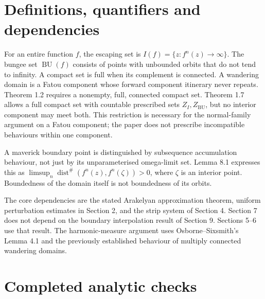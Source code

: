 \documentclass[10pt]{article}
\begin{document}
\section*{Definitions, quantifiers and dependencies}
For an entire function \(f\), the escaping set is \(I(f)=\{z:f^n(z)\to\infty\}\). The bungee set \(\operatorname{BU}(f)\) consists of points with unbounded orbits that do not tend to infinity. A compact set is full when its complement is connected. A wandering domain is a Fatou component whose forward component itinerary never repeats. Theorem 1.2 requires a nonempty, full, connected compact set. Theorem 1.7 allows a full compact set with countable prescribed sets \(Z_I,Z_{\operatorname{BU}}\), but no interior component may meet both. This restriction is necessary for the normal-family argument on a Fatou component; the paper does not prescribe incompatible behaviours within one component.\par
A maverick boundary point is distinguished by subsequence accumulation behaviour, not just by its unparameterised omega-limit set. Lemma 8.1 expresses this as \(\limsup_n\operatorname{dist}^\#(f^n(z),f^n(\zeta))>0\), where \(\zeta\) is an interior point. Boundedness of the domain itself is not boundedness of its orbits.\par
The core dependencies are the stated Arakelyan approximation theorem, uniform perturbation estimates in Section 2, and the strip system of Section 4. Section 7 does not depend on the boundary interpolation result of Section 9. Sections 5–6 use that result. The harmonic-measure argument uses Osborne–Sixsmith’s Lemma 4.1 and the previously established behaviour of multiply connected wandering domains.\par
\section*{Completed analytic checks}
\end{document}
